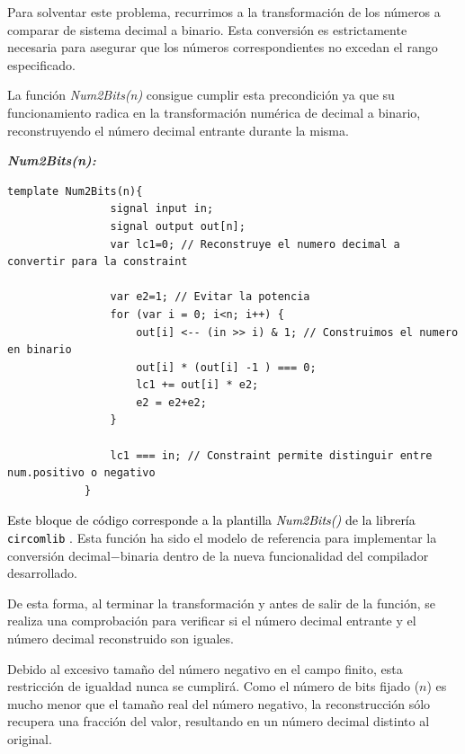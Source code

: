 \documentclass[a4paper,12pt]{report}
\begin{document}
	\vspace{0.2cm}
	\noindent Para solventar este problema, recurrimos a la transformación de los números a comparar de sistema decimal a binario. Esta conversión es estrictamente necesaria para asegurar que los números correspondientes no excedan el rango especificado.
	
	\vspace{0.2cm}
	\noindent La función \textit{Num2Bits(n)} consigue cumplir esta precondición ya que su funcionamiento radica en la transformación numérica de decimal a binario, reconstruyendo el número decimal entrante durante la misma.
	
	\vspace{0.3cm}
	\begin{codigo}
		\textbf{\textit{Num2Bits(n):}}    
		
		\begin{lstlisting}[language=Circom]
			template Num2Bits(n){
				signal input in;
				signal output out[n];
				var lc1=0; // Reconstruye el numero decimal a convertir para la constraint
				
				var e2=1; // Evitar la potencia
				for (var i = 0; i<n; i++) {
					out[i] <-- (in >> i) & 1; // Construimos el numero en binario
					out[i] * (out[i] -1 ) === 0;
					lc1 += out[i] * e2;
					e2 = e2+e2;
				}
				
				lc1 === in; // Constraint permite distinguir entre num.positivo o negativo
			}
		\end{lstlisting}
		
		\caption{Función Num2Bits(n)}
		\label{cod:num2bits}
	\end{codigo}
	
	
	\noindent \textcolor{black}{Este bloque de código corresponde a la plantilla \textit{Num2Bits()} de la librería \texttt{circomlib} \cite{iden3_circomlib_bitify}.} Esta función ha sido el modelo de referencia para implementar la conversión decimal$-$binaria dentro de la nueva funcionalidad del compilador desarrollado.
	
	
	\vspace{0.6cm}
	\noindent De esta forma, al terminar la transformación y antes de salir de la función, se realiza una comprobación para verificar si el número decimal entrante y el número decimal reconstruido son iguales.\vspace{0.2cm}
	
	\vspace{0.2cm}
	\noindent Debido al excesivo tamaño del número negativo en el campo finito, esta restricción de igualdad nunca se cumplirá. Como el número de bits fijado ($n$) es mucho menor que el tamaño real del número negativo, la reconstrucción sólo recupera una fracción del valor, resultando en un número decimal distinto al original.
	
\end{document}
